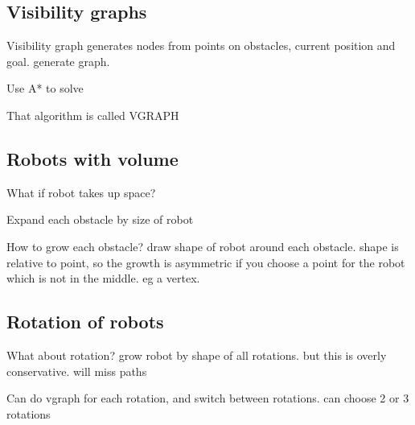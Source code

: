 
\subsection{Visibility graphs}

Visibility graph generates nodes from points on obstacles, current position and goal. generate graph.

Use A* to solve

That algorithm is called VGRAPH

\subsection{Robots with volume}

What if robot takes up space?

Expand each obstacle by size of robot

How to grow each obstacle? draw shape of robot around each obstacle. shape is relative to point, so the growth is asymmetric if you choose a point for the robot which is not in the middle. eg a vertex.

\subsection{Rotation of robots}

What about rotation? grow robot by shape of all rotations. but this is overly conservative. will miss paths

Can do vgraph for each rotation, and switch between rotations. can choose 2 or 3 rotations


